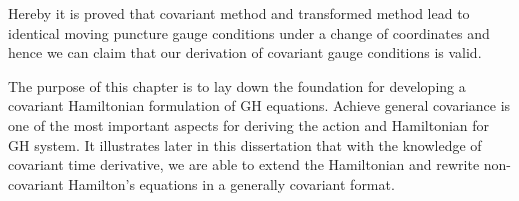 Hereby it is proved that covariant method and transformed method lead to identical moving puncture gauge conditions under a change of coordinates and hence we can claim that our derivation of covariant gauge conditions is valid. 

The purpose of this chapter is to lay down the foundation for developing a covariant Hamiltonian formulation of GH equations. Achieve general covariance is one of the most important aspects for deriving the action and Hamiltonian for GH system. It illustrates later in this dissertation that with the knowledge of covariant time derivative, we are able to extend the Hamiltonian and rewrite non-covariant Hamilton's equations in a generally covariant format.  

